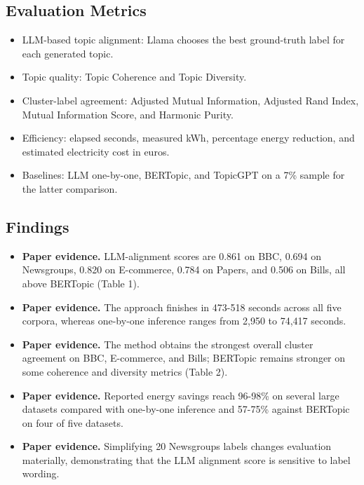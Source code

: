 \documentclass[11pt]{article}
\begin{document}
\subsection{Evaluation Metrics}\label{evaluation-metrics-2}

\begin{itemize}
\item
  LLM-based topic alignment: Llama chooses the best ground-truth label
  for each generated topic.
\item
  Topic quality: Topic Coherence and Topic Diversity.
\item
  Cluster-label agreement: Adjusted Mutual Information, Adjusted Rand
  Index, Mutual Information Score, and Harmonic Purity.
\item
  Efficiency: elapsed seconds, measured kWh, percentage energy
  reduction, and estimated electricity cost in euros.
\item
  Baselines: LLM one-by-one, BERTopic, and TopicGPT on a 7\% sample for
  the latter comparison.
\end{itemize}

\subsection{Findings}\label{findings-2}

\begin{itemize}
\item
  \textbf{Paper evidence.} LLM-alignment scores are 0.861 on BBC, 0.694 on Newsgroups,
  0.820 on E-commerce, 0.784 on Papers, and 0.506 on Bills, all above
  BERTopic (Table 1).
\item
  \textbf{Paper evidence.} The approach finishes in 473-518 seconds across all five
  corpora, whereas one-by-one inference ranges from 2,950 to 74,417
  seconds.
\item
  \textbf{Paper evidence.} The method obtains the strongest overall cluster agreement
  on BBC, E-commerce, and Bills; BERTopic remains stronger on some
  coherence and diversity metrics (Table 2).
\item
  \textbf{Paper evidence.} Reported energy savings reach 96-98\% on several large
  datasets compared with one-by-one inference and 57-75\% against
  BERTopic on four of five datasets.
\item
  \textbf{Paper evidence.} Simplifying 20 Newsgroups labels changes evaluation
  materially, demonstrating that the LLM alignment score is sensitive to
  label wording.
\end{itemize}
\end{document}

